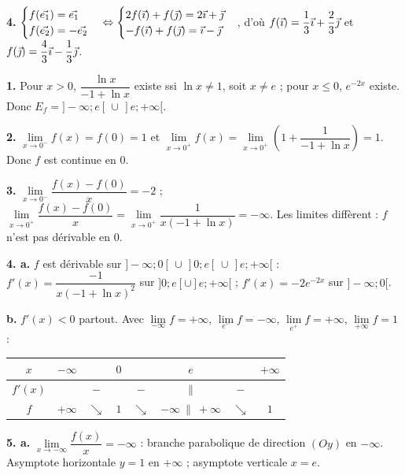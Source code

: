 \documentclass[11pt]{article}
\begin{document}
\textbf{4.} $\begin{cases} f(\vec{e_1}) = \vec{e_1} \\ f(\vec{e_2}) = -\vec{e_2} \end{cases} \Leftrightarrow \begin{cases} 2f(\vec{\imath}) + f(\vec{\jmath}) = 2\vec{\imath} + \vec{\jmath} \\ -f(\vec{\imath}) + f(\vec{\jmath}) = \vec{\imath} - \vec{\jmath} \end{cases}$, d'où $f(\vec{\imath}) = \dfrac{1}{3}\vec{\imath} + \dfrac{2}{3}\vec{\jmath}$ et $f(\vec{\jmath}) = \dfrac{4}{3}\vec{\imath} - \dfrac{1}{3}\vec{\jmath}$.

\textbf{1.} Pour $x > 0$, $\dfrac{\ln x}{-1 + \ln x}$ existe ssi $\ln x \ne 1$, soit $x \ne e$ ; pour $x \le 0$, $e^{-2x}$ existe. Donc $E_f = ]-\infty;e[\,\cup\,]e;+\infty[$.

\textbf{2.} $\lim\limits_{x\to 0^-} f(x) = f(0) = 1$ et $\lim\limits_{x\to 0^+} f(x) = \lim\limits_{x\to 0^+}\left(1 + \dfrac{1}{-1+\ln x}\right) = 1$. Donc $f$ est continue en 0.

\textbf{3.} $\lim\limits_{x\to 0^-}\dfrac{f(x)-f(0)}{x} = -2$ ; $\lim\limits_{x\to 0^+}\dfrac{f(x)-f(0)}{x} = \lim\limits_{x\to 0^+}\dfrac{1}{x(-1+\ln x)} = -\infty$. Les limites diffèrent : $f$ n'est pas dérivable en 0.

\textbf{4. a.} $f$ est dérivable sur $]-\infty;0[\,\cup\,]0;e[\,\cup\,]e;+\infty[$ : $f'(x) = \dfrac{-1}{x(-1+\ln x)^2}$ sur $]0;e[\cup]e;+\infty[$ ; $f'(x) = -2e^{-2x}$ sur $]-\infty;0[$.

\textbf{b.} $f'(x) < 0$ partout. Avec $\lim\limits_{-\infty} f = +\infty$, $\lim\limits_{e^-} f = -\infty$, $\lim\limits_{e^+} f = +\infty$, $\lim\limits_{+\infty} f = 1$ :
\begin{center}\renewcommand{\arraystretch}{1.4}
\begin{tabular}{|c|ccccccc|}
\hline $x$ & $-\infty$ & & $0$ & & $e$ & & $+\infty$ \\\hline $f'(x)$ & & $-$ & & $-$ & $\|$ & $-$ & \\\hline
$f$ & $+\infty$ & $\searrow$ & $1$ & $\searrow$ & $-\infty\ \|\ +\infty$ & $\searrow$ & $1$ \\\hline
\end{tabular}
\end{center}

\textbf{5. a.} $\lim\limits_{x\to-\infty}\dfrac{f(x)}{x} = -\infty$ : branche parabolique de direction $(Oy)$ en $-\infty$. Asymptote horizontale $y = 1$ en $+\infty$ ; asymptote verticale $x = e$.
\end{document}
